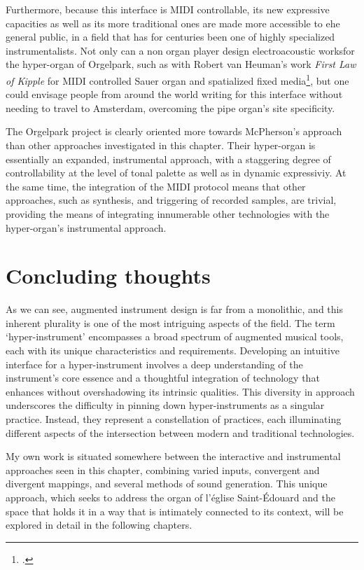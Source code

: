 \documentclass[12pt,twoside,maitrise]{dms_ks}
\theoremstyle{definition}
\begin{document}
{Furthermore, because this interface is MIDI controllable, its new expressive capacities as well as its more traditional ones are made more accessible to ehe general public, in a field that has for centuries been one of highly specialized instrumentalists. Not only can a non organ player design electroacoustic worksfor the hyper-organ of Orgelpark, such as with Robert van Heuman's work \textit{First Law of Kipple} for MIDI controlled Sauer organ and spatialized fixed media\footcite[190]{van_heumen_new_2014}, but one could envisage people from around the world writing for this interface without needing to travel to Amsterdam, overcoming the pipe organ's site specificity.

The Orgelpark project is clearly oriented more towards McPherson's approach than other approaches investigated in this chapter.
Their hyper-organ is essentially an expanded, instrumental approach, with a staggering degree of controllability at the level of tonal palette as well as in dynamic expressiviy.
At the same time, the integration of the MIDI protocol means that other approaches, such as synthesis, and triggering of recorded samples, are trivial, providing the means of integrating innumerable other technologies with the hyper-organ's instrumental approach.

\section{Concluding thoughts}

As we can see, augmented instrument design is far from a monolithic, and this inherent plurality is one of the most intriguing aspects of the field.
The term `hyper-instrument' encompasses a broad spectrum of augmented musical tools, each with its unique characteristics and requirements.
Developing an intuitive interface for a hyper-instrument involves a deep understanding of the instrument's core essence and a thoughtful integration of technology that enhances without overshadowing its intrinsic qualities.
This diversity in approach underscores the difficulty in pinning down hyper-instruments as a singular practice.
Instead, they represent a constellation of practices, each illuminating different aspects of the intersection between modern and traditional technologies.

My own work is situated somewhere between the interactive and instrumental approaches seen in this chapter, combining varied inputs, convergent and divergent mappings, and several methods of sound generation.
This unique approach, which seeks to address the organ of l'église Saint-Édouard and the space that holds it in a way that is intimately connected to its context, will be explored in detail in the following chapters. 

}
\end{document}
